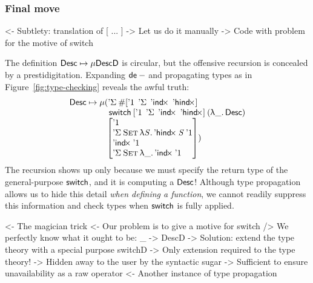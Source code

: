 \subsubsection{Final move}

\begin{wstructure}
<- Subtlety: translation of [ ... ]
    -> Let us do it manually
        -> Code with problem for the motive of switch
\end{wstructure}

The definition \(\Desc \mapsto \Mu{\DescD}\) is circular,
but the offensive recursion is concealed by a prestidigitation.
Expanding \(\toDesc{-}\) and propagating types as in
Figure~\ref{fig:type-checking} reveals the
awful truth:
\[
\Desc\mapsto
\Mu{\stk{(\DSigma{\EnumT{\sqr{ \DUnit\:\: \SYMBDSigma\:\: \SYMBDIndx\:\: \SYMBDHindx}}\\}
    {\;\SYMBswitch\:\sqr{ \DUnit\:\: \SYMBDSigma\:\: \SYMBDIndx\:\: \SYMBDHindx}\:(\LAM{\_}\Desc)\\
\;\sqr{\stkm{
\DUnit                                            \\
                                   \DSigma{\Set}{\LAM{\V{S}} \DHindx{\V{S}}{\DUnit}}   \\
                                   \DIndx{\DUnit}                                    \\
                                   \DSigma{\Set}{\LAM{\_} \DIndx{\DUnit}}
}}})}}
\]
The recursion shows up only because we must specify the return type
of the general-purpose \(\F{switch}\), and it is computing a \(\Desc\)!
Although type propagation
allows us to hide this detail \emph{when defining a function}, we cannot
readily suppress this information and check types
when \(\F{switch}\) is fully applied.

\begin{wstructure}
<- The magician trick
    <- Our problem is to give a motive for switch
        /> We perfectly know what it ought to be: \_ -> DescD
    -> Solution: extend the type theory with a special purpose switchD
        -> Only extension required to the type theory!
        -> Hidden away to the user by the syntactic sugar
            -> Sufficient to ensure unavailability as a raw operator
            <- Another instance of type propagation
\end{wstructure}

%
%

